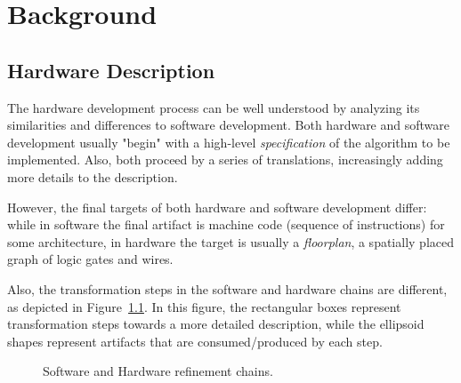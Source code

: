 \chapter{Background}
\label{chap:background}

    \section{Hardware Description}
    \label{sec:hardware-description}
        The hardware development process can be well understood by analyzing its
        similarities and differences to software development.
        Both hardware and software development usually "begin" with a high-level \emph{specification}
        of the algorithm to be implemented.
        Also, both proceed by a series of translations, increasingly adding more details to the description.

        However, the final targets of both hardware and software development differ:
        while in software the final artifact is machine code (sequence of instructions) for some architecture,
        in hardware the target is usually a \emph{floorplan}, a spatially placed graph of logic gates and wires.

        Also, the transformation steps in the software and hardware chains are different,
        as depicted in Figure~\ref{fig:sw-hw-chains}.
        In this figure, the rectangular boxes represent transformation steps towards a more detailed description,
        while the ellipsoid shapes represent artifacts that are consumed/produced by each step.

        \begin{figure}[h]
            \caption{Software and Hardware refinement chains. \label{fig:sw-hw-chains}}
        \end{figure}

